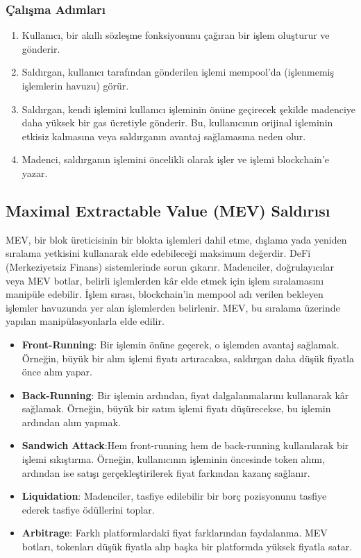 \subsubsection{Çalışma Adımları}

\begin{enumerate}
    \item Kullanıcı, bir akıllı sözleşme fonksiyonunu çağıran bir işlem oluşturur ve gönderir.
    \item Saldırgan, kullanıcı tarafından gönderilen işlemi mempool'da (işlenmemiş işlemlerin havuzu) görür.
    \item Saldırgan, kendi işlemini kullanıcı işleminin önüne geçirecek şekilde madenciye daha yüksek bir gas ücretiyle gönderir. Bu, kullanıcının orijinal işleminin etkisiz kalmasına veya saldırganın avantaj sağlamasına neden olur.
    \item Madenci, saldırganın işlemini öncelikli olarak işler ve işlemi blockchain'e yazar.
\end{enumerate}

\subsection{Maximal Extractable Value (MEV) Saldırısı}

MEV, bir blok üreticisinin bir blokta işlemleri dahil etme, dışlama yada yeniden sıralama yetkisini kullanarak elde edebileceği maksimum değerdir. DeFi (Merkeziyetsiz Finans) sistemlerinde sorun çıkarır. Madenciler, doğrulayıcılar veya MEV botlar, belirli işlemlerden kâr elde etmek için işlem sıralamasını manipüle edebilir. İşlem sırası, blockchain'in mempool adı verilen bekleyen işlemler havuzunda yer alan işlemlerden belirlenir. MEV, bu sıralama üzerinde yapılan manipülasyonlarla elde edilir.

\begin{itemize}
    \item \textbf{Front-Running}: Bir işlemin önüne geçerek, o işlemden avantaj sağlamak. Örneğin, büyük bir alım işlemi fiyatı artıracaksa, saldırgan daha düşük fiyatla önce alım yapar.
    \item \textbf{Back-Running}: Bir işlemin ardından, fiyat dalgalanmalarını kullanarak kâr sağlamak. Örneğin, büyük bir satım işlemi fiyatı düşürecekse, bu işlemin ardından alım yapmak.
    \item \textbf{Sandwich Attack}:Hem front-running hem de back-running kullanılarak bir işlemi sıkıştırma. Örneğin, kullanıcının işleminin öncesinde token alımı, ardından ise satışı gerçekleştirilerek fiyat farkından kazanç sağlanır.
    \item \textbf{Liquidation}: Madenciler, tasfiye edilebilir bir borç pozisyonunu tasfiye ederek tasfiye ödüllerini toplar.
    \item \textbf{Arbitrage}: Farklı platformlardaki fiyat farklarından faydalanma. MEV botları, tokenları düşük fiyatla alıp başka bir platformda yüksek fiyatla satar.
\end{itemize}

